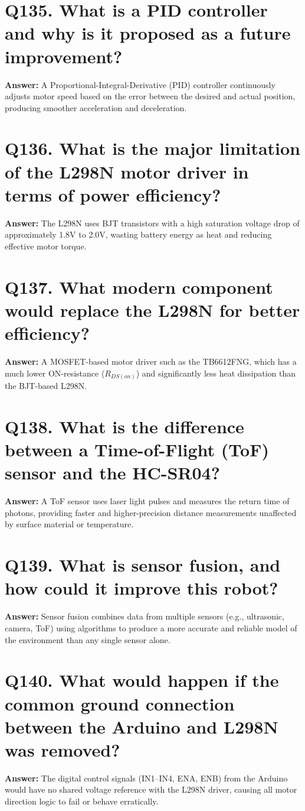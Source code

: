 \documentclass[12pt,a4paper,oneside]{report}
\begin{document}
\section{Q135. What is a PID controller and why is it proposed as a future improvement?}
\textbf{Answer:} A Proportional-Integral-Derivative (PID) controller continuously adjusts motor speed based on the error between the desired and actual position, producing smoother acceleration and deceleration.

\section{Q136. What is the major limitation of the L298N motor driver in terms of power efficiency?}
\textbf{Answer:} The L298N uses BJT transistors with a high saturation voltage drop of approximately 1.8V to 2.0V, wasting battery energy as heat and reducing effective motor torque.

\section{Q137. What modern component would replace the L298N for better efficiency?}
\textbf{Answer:} A MOSFET-based motor driver such as the TB6612FNG, which has a much lower ON-resistance ($R_{DS(on)}$) and significantly less heat dissipation than the BJT-based L298N.

\section{Q138. What is the difference between a Time-of-Flight (ToF) sensor and the HC-SR04?}
\textbf{Answer:} A ToF sensor uses laser light pulses and measures the return time of photons, providing faster and higher-precision distance measurements unaffected by surface material or temperature.

\section{Q139. What is sensor fusion, and how could it improve this robot?}
\textbf{Answer:} Sensor fusion combines data from multiple sensors (e.g., ultrasonic, camera, ToF) using algorithms to produce a more accurate and reliable model of the environment than any single sensor alone.

\section{Q140. What would happen if the common ground connection between the Arduino and L298N was removed?}
\textbf{Answer:} The digital control signals (IN1--IN4, ENA, ENB) from the Arduino would have no shared voltage reference with the L298N driver, causing all motor direction logic to fail or behave erratically.
\end{document}
